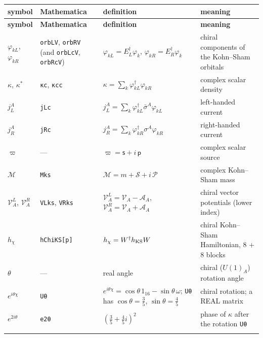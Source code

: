 \documentclass[10pt,a4paper]{article}
\begin{document}
{\small
\begin{longtable}{>{\raggedright\arraybackslash}p{}>{\raggedright\arraybackslash}p{}>{\raggedright\arraybackslash}p{}>{\raggedright\arraybackslash}p{}}
\toprule
\textbf{symbol} & \textbf{Mathematica} & \textbf{definition} & \textbf{meaning} \\
\midrule\endfirsthead
\toprule
\textbf{symbol} & \textbf{Mathematica} & \textbf{definition} & \textbf{meaning} \\
\midrule\endhead
\endfoot
\bottomrule\endlastfoot
$\varphi_{kL}$, $\varphi_{kR}$ & \texttt{orbLV}, \texttt{orbRV} (and \texttt{orbLcV}, \texttt{orbRcV}) & $\varphi_{kL}=E_L^\dagger\varphi_k$, $\varphi_{kR}=E_R^\dagger\varphi_k$ & chiral components of the Kohn–Sham orbitals \\
$\kappa$, $\kappa^*$ & \texttt{κc}, \texttt{κcc} & $\kappa=\sum_k\varphi_{kL}^\dagger\varphi_{kR}$ & complex scalar density \\
$j_L^A$ & \texttt{jLc} & $j_L^A=\sum_k\varphi_{kL}^\dagger\bar\sigma^A\varphi_{kL}$ & left-handed current \\
$j_R^A$ & \texttt{jRc} & $j_R^A=\sum_k\varphi_{kR}^\dagger\sigma^A\varphi_{kR}$ & right-handed current \\
$\varpi$ & — & $\varpi=\mathsf s+i\,\mathsf p$ & complex scalar source \\
$\mathcal M$ & \texttt{Mks} & $\mathcal M=m+\mathcal S+i\,\mathcal P$ & complex Kohn–Sham mass \\
$\mathcal V^L_A$, $\mathcal V^R_A$ & \texttt{VLks}, \texttt{VRks} & $\mathcal V^L_A=\mathcal V_A-\mathcal A_A$, $\mathcal V^R_A=\mathcal V_A+\mathcal A_A$ & chiral vector potentials (lower index) \\
$h_\chi$ & \texttt{hChiKS[p]} & $h_\chi=W^\dagger h_{\rm KS}W$ & chiral Kohn–Sham Hamiltonian, 8 + 8 blocks \\
$\theta$ & — & real angle & chiral ($U(1)_A$) rotation angle \\
$e^{i\theta\chi}$ & \texttt{Uθ} & $e^{i\theta\chi}=\cos\theta\,1_{16}-\sin\theta\,\omega$; \texttt{Uθ} has $\cos\theta=\frac35$, $\sin\theta=\frac45$ & chiral rotation; a REAL matrix \\
$e^{2i\theta}$ & \texttt{e2θ} & $(\frac35+\frac45i)^2$ & phase of $\kappa$ after the rotation \texttt{Uθ} \\*
\end{longtable}}
\end{document}
